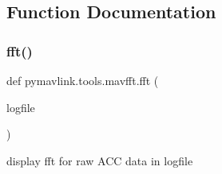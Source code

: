\subsection{Function Documentation}
\mbox{\label{namespacepymavlink_1_1tools_1_1mavfft_a319827e54762dc95afaa783e0ff75ca0}} 
\subsubsection{\texorpdfstring{fft()}{fft()}}
{\footnotesize\ttfamily def pymavlink.\+tools.\+mavfft.\+fft (\begin{DoxyParamCaption}\item[{}]{logfile }\end{DoxyParamCaption})}

\begin{DoxyVerb}display fft for raw ACC data in logfile\end{DoxyVerb}
 